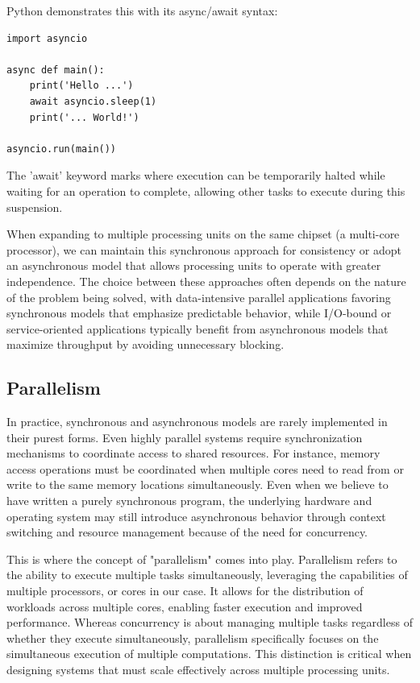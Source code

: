 \documentclass[12pt,a4paper]{article}
\begin{document}
Python demonstrates this with its async/await syntax:
\begin{verbatim}
import asyncio

async def main():
    print('Hello ...')
    await asyncio.sleep(1)
    print('... World!')

asyncio.run(main())
\end{verbatim}

The 'await' keyword marks where execution can be temporarily halted while waiting for an operation to complete, allowing other tasks to execute during this suspension.

When expanding to multiple processing units on the same chipset (a multi-core processor), we can maintain this synchronous approach for consistency or adopt an asynchronous model that allows processing units to operate with greater independence. The choice between these approaches often depends on the nature of the problem being solved, with data-intensive parallel applications favoring synchronous models that emphasize predictable behavior, while I/O-bound or service-oriented applications typically benefit from asynchronous models that maximize throughput by avoiding unnecessary blocking.

\subsection{Parallelism}

In practice, synchronous and asynchronous models are rarely implemented in their purest forms. Even highly parallel systems require synchronization mechanisms to coordinate access to shared resources\parencite[p. 95]{Rauber2023}. For instance, memory access operations must be coordinated when multiple cores need to read from or write to the same memory locations simultaneously. Even when we believe to have written a purely synchronous program, the underlying hardware and operating system may still introduce asynchronous behavior through context switching and resource management because of the need for concurrency.

This is where the concept of "parallelism" comes into play\parencite[pp. 4-5]{Rauber2023}. Parallelism refers to the ability to execute multiple tasks simultaneously, leveraging the capabilities of multiple processors, or cores in our case. It allows for the distribution of workloads across multiple cores, enabling faster execution and improved performance. Whereas concurrency is about managing multiple tasks regardless of whether they execute simultaneously, parallelism specifically focuses on the simultaneous execution of multiple computations. This distinction is critical when designing systems that must scale effectively across multiple processing units.
\end{document}
